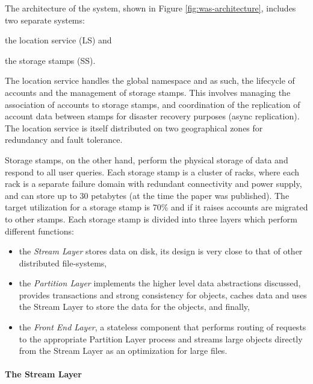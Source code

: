 The architecture of the system, shown in Figure \ref{fig:was-architecture}, includes two separate systems:
\begin{inparaenum}[i)]
    \item the location service (LS) and
    \item the storage stamps (SS).
\end{inparaenum}
The location service handles the global namespace and as such, the lifecycle of accounts and the management of storage stamps.
This involves managing the association of accounts to storage stamps, and coordination of the replication of account data between stamps for disaster recovery purposes (async replication).
The location service is itself distributed on two geographical zones for redundancy and fault tolerance.

Storage stamps, on the other hand, perform the physical storage of data and respond to all user queries.
Each storage stamp is a cluster of racks, where each rack is a separate failure domain with redundant connectivity and power supply, and can store up to 30 petabytes (at the time the paper was published).
The target utilization for a storage stamp is 70\% and if it raises accounts are migrated to other stamps.
Each storage stamp is divided into three layers which perform different functions:
\begin{itemize}
    \item the \emph{Stream Layer} stores data on disk, its design is very close to that of other distributed file-systems,
    \item the \emph{Partition Layer} implements the higher level data abstractions discussed, provides transactions and strong consistency for objects, caches data and uses the Stream Layer to store the data for the objects, and finally,
    \item the \emph{Front End Layer}, a stateless component that performs routing of requests to the appropriate Partition Layer process and streams large objects directly from the Stream Layer as an optimization for large files.
\end{itemize}

\paragraph{The Stream Layer}

